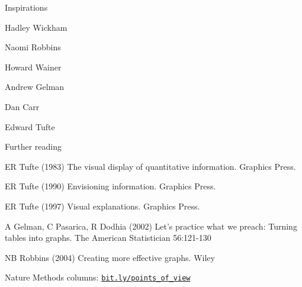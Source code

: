 \documentclass[aspectratio=169,12pt,t]{beamer}
\begin{document}
\begin{frame}{Inspirations}


\bbi
\item Hadley Wickham

\item Naomi Robbins

\item Howard Wainer

\item Andrew Gelman

\item Dan Carr

\item Edward Tufte
  \ei


\end{frame}





\begin{frame}{Further reading}

\vspace{-12pt}

  \bbi
\item ER Tufte (1983) The visual display of quantitative information.
Graphics Press.
\item ER Tufte (1990) Envisioning information. Graphics Press.
\item ER Tufte (1997) Visual explanations. Graphics Press.

\vspace{12pt}

\item A Gelman, C Pasarica, R Dodhia (2002) Let's practice what we preach:
Turning tables into graphs. The American Statistician 56:121-130

\vspace{12pt}

\item NB Robbins (2004) Creating more effective graphs. Wiley

\vspace{12pt}

\item Nature Methods columns: \href{https://bit.ly/points_of_view}{\tt bit.ly/points\_of\_view}
\ei

\end{frame}
\end{document}
